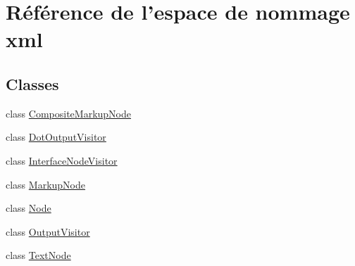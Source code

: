 \hypertarget{namespacexml}{
\section{Référence de l'espace de nommage xml}
\label{namespacexml}
}
\subsection*{Classes}
\begin{DoxyCompactItemize}
\item 
class \hyperlink{classxml_1_1_composite_markup_node}{CompositeMarkupNode}
\item 
class \hyperlink{classxml_1_1_dot_output_visitor}{DotOutputVisitor}
\item 
class \hyperlink{classxml_1_1_interface_node_visitor}{InterfaceNodeVisitor}
\item 
class \hyperlink{classxml_1_1_markup_node}{MarkupNode}
\item 
class \hyperlink{classxml_1_1_node}{Node}
\item 
class \hyperlink{classxml_1_1_output_visitor}{OutputVisitor}
\item 
class \hyperlink{classxml_1_1_text_node}{TextNode}
\end{DoxyCompactItemize}
